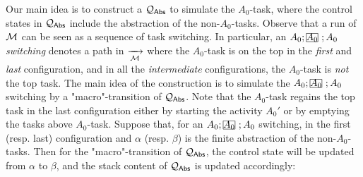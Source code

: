 {%

Our main idea is to construct a {\WOTrPDS} ${\mathcal{Q} }_{{\mathsf{Abs} }}$ to simulate the $A_0$-task, where the control states in ${\mathcal{Q} }_{{\mathsf{Abs} }}$ include the abstraction of the non-$A_0$-tasks.
Observe that a run of ${\mathcal{M} }$ can be seen as a sequence of task switching. In particular, an $A_0;\mhcancel{A_0};A_0$ \emph{switching} denotes a path in $\xrightarrow[{\mathcal{M} }]{}$ where the $A_0$-task is on the top in the \emph{first} and \emph{last} configuration, and in all the \emph{intermediate} configurations, the $A_0$-task is \emph{not} the top task. The main idea of the construction is to simulate the $A_0;\mhcancel{A_0};A_0$ switching by a "macro"-transition of ${\mathcal{Q} }_{{\mathsf{Abs} }}$. Note that the $A_0$-task regains the top task in the last configuration either by starting the activity $A_0'$ or by emptying the tasks above $A_0$-task. Suppose that, for an $A_0;\mhcancel{A_0};A_0$ switching, in the first (resp. last) configuration and $\alpha$ (resp. $\beta$) is the finite abstraction of the non-$A_0$-tasks. Then for the "macro"-transition of ${\mathcal{Q} }_{{\mathsf{Abs} }}$, the control state will be updated from $\alpha$ to $\beta$, and the stack content of ${\mathcal{Q} }_{{\mathsf{Abs} }}$ is updated accordingly:

}
